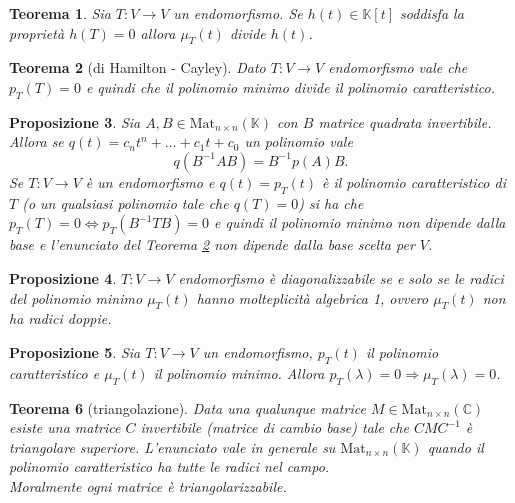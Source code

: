 \documentclass[9pt, a4paper]{article}
\newcommand{\C}{\mathbb{C}}
\newcommand{\K}{\mathbb{K}}
\theoremstyle{mythm}
\newtheorem{thm}{Teorema}[section]
\newtheorem{prop}[thm]{Proposizione}
\begin{document}
\begin{thm}
	Sia $ T \colon V \to V $ un endomorfismo. Se $ h(t) \in \K[t] $ soddisfa la proprietà $ h(T) = 0 $ allora $ \mu_T(t) $ divide $ h(t) $. 
\end{thm}

\begin{thm}[di Hamilton - Cayley] \label{thm:HC}
	Dato $ T \colon V \to V $ endomorfismo vale che $ p_T(T) = 0 $ e quindi che il polinomio minimo divide il polinomio caratteristico. 
\end{thm}

\begin{prop}
	Sia $ A, B \in \mathrm{Mat}_{n \times n} (\K) $ con $ B $ matrice quadrata invertibile. Allora se $ q(t) = c_n t^{n} + \ldots + c_1 t + c_0 $ un polinomio vale \[q(B^{-1} A B) = B^{-1} p(A) B. \] Se $ T \colon V \to V $ è un endomorfismo  e $ q(t) = p_T(t) $ è il polinomio caratteristico di $ T $ (o un qualsiasi polinomio tale che $ q(T) = 0 $) si ha che $ p_T(T) = 0 \Leftrightarrow p_T(B^{-1} T B) = 0 $ e quindi il polinomio minimo non dipende dalla base e l'enunciato del Teorema \ref{thm:HC} non dipende dalla base scelta per $ V $. 
\end{prop}

\begin{prop}
	$ T \colon V \to V $ endomorfismo è diagonalizzabile se e solo se le radici del polinomio minimo $ \mu_T(t) $ hanno molteplicità algebrica 1, ovvero $ \mu_T(t) $ non ha radici doppie. 
\end{prop}

\begin{prop}
	Sia $ T \colon V \to V $ un endomorfismo, $ p_T(t) $ il polinomio caratteristico e $ \mu_T(t) $ il polinomio minimo. Allora $ p_T(\lambda) = 0 \Rightarrow \mu_T(\lambda) = 0 $. 
\end{prop}

\begin{thm}[triangolazione]
	Data una qualunque matrice $ M \in \mathrm{Mat}_{n \times n} (\C) $ esiste una matrice $ C $ invertibile (matrice di cambio base) tale che $ CMC^{-1} $ è triangolare superiore. L'enunciato vale in generale su $ \mathrm{Mat}_{n \times n} (\K) $ quando il polinomio caratteristico ha tutte le radici nel campo. \\ Moralmente ogni matrice è triangolarizzabile. 
\end{thm}

\vspace{2mm}
\end{document}
